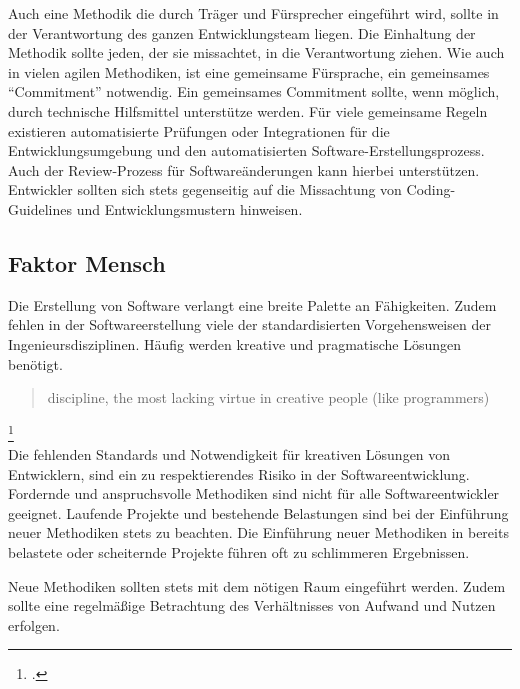 Auch eine Methodik die durch Träger und Fürsprecher eingeführt wird, sollte in der Verantwortung des ganzen Entwicklungsteam liegen. Die Einhaltung der Methodik sollte jeden, der sie missachtet, in die Verantwortung ziehen.
Wie auch in vielen agilen Methodiken, ist eine gemeinsame Fürsprache, ein gemeinsames ``Commitment'' notwendig. Ein gemeinsames Commitment sollte, wenn möglich, durch technische Hilfsmittel unterstütze werden. Für viele gemeinsame Regeln existieren automatisierte Prüfungen oder Integrationen für die Entwicklungsumgebung und den automatisierten Software-Erstellungsprozess.
Auch der Review-Prozess für Softwareänderungen kann hierbei unterstützen. Entwickler sollten sich stets gegenseitig auf die Missachtung von Coding-Guidelines und Entwicklungsmustern hinweisen.

\subsection{Faktor Mensch}

Die Erstellung von Software verlangt eine breite Palette an Fähigkeiten. Zudem fehlen in der Softwareerstellung viele der standardisierten Vorgehensweisen der Ingenieursdisziplinen. Häufig werden kreative und pragmatische Lösungen benötigt.

\blockquote {discipline, the most lacking virtue in creative people (like programmers)}\footcite[][S.167]{git-essentials-2017}
\vspace{1em}\\
Die fehlenden Standards und Notwendigkeit für kreativen Lösungen von Entwicklern, sind ein zu respektierendes Risiko in der Softwareentwicklung. Fordernde und anspruchsvolle Methodiken sind nicht für alle Softwareentwickler geeignet. Laufende Projekte und bestehende Belastungen sind bei der Einführung neuer Methodiken stets zu beachten. Die Einführung neuer Methodiken in bereits belastete oder scheiternde Projekte führen oft zu schlimmeren Ergebnissen.

Neue Methodiken sollten stets mit dem nötigen Raum eingeführt werden. Zudem sollte eine regelmäßige Betrachtung des Verhältnisses von Aufwand und Nutzen erfolgen.

